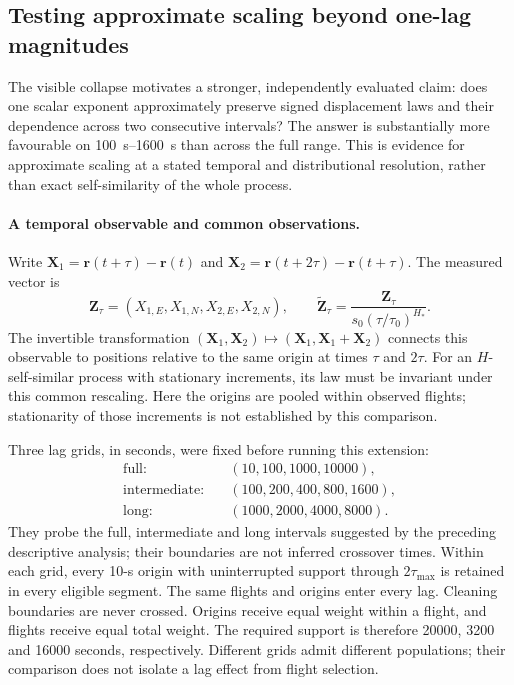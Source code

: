 \subsection{Testing approximate scaling beyond one-lag magnitudes}
\label{sec:transport-temporal-scaling}

The visible collapse motivates a stronger, independently evaluated claim:
does one scalar exponent approximately preserve signed displacement laws and
their dependence across two consecutive intervals? The answer is substantially
more favourable on \SIrange{100}{1600}{\second} than across the full range.
This is evidence for approximate scaling at a stated temporal and distributional
resolution, rather than exact self-similarity of the whole process.

\paragraph{A temporal observable and common observations.}
Write $\mathbf X_1=\mathbf r(t+\tau)-\mathbf r(t)$ and
$\mathbf X_2=\mathbf r(t+2\tau)-\mathbf r(t+\tau)$. The measured vector is
\begin{equation}
 \mathbf Z_\tau=(X_{1,E},X_{1,N},X_{2,E},X_{2,N}),\qquad
 \widetilde{\mathbf Z}_\tau=
 \frac{\mathbf Z_\tau}{s_0(\tau/\tau_0)^{H_*}}.
 \label{eq:two-interval-scaling}
\end{equation}
The invertible transformation $(\mathbf X_1,\mathbf X_2)\mapsto
(\mathbf X_1,\mathbf X_1+\mathbf X_2)$ connects this observable to positions
relative to the same origin at times $\tau$ and $2\tau$. For an $H$-self-similar
process with stationary increments, its law must be invariant under this common
rescaling. Here the origins are pooled within observed flights; stationarity of
those increments is not established by this comparison.

Three lag grids, in seconds, were fixed before running this extension:
\[
 \begin{aligned}
  \text{full:}\quad &(10,100,1000,10000),\\
  \text{intermediate:}\quad &(100,200,400,800,1600),\\
  \text{long:}\quad &(1000,2000,4000,8000).
 \end{aligned}
\]
They probe the full, intermediate and long intervals suggested by the preceding descriptive analysis;
their boundaries are not inferred crossover times. Within each grid, every
10-s origin with uninterrupted support through $2\tau_{\max}$ is retained in
every eligible segment. The same flights and origins enter every lag. Cleaning
boundaries are never crossed. Origins receive equal weight within a flight,
and flights receive equal total weight. The required support is therefore
20000, 3200 and 16000 seconds, respectively. Different grids admit different
populations; their comparison does not isolate a lag effect from flight selection.

